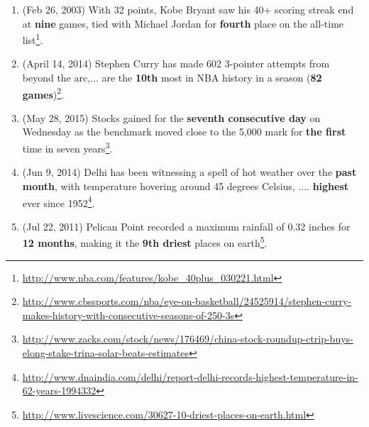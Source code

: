 \begin{enumerate}
\setlength\itemsep{-0.05cm}
\item(Feb 26, 2003) With 32 points, Kobe Bryant saw his 40+ scoring streak end at \textbf{nine} games,  tied with Michael Jordan for \textbf{fourth} place on the all-time list\footnote{\url{http://www.nba.com/features/kobe_40plus_030221.html}}. 

\item(April 14, 2014) Stephen Curry has made 602 3-pointer attempts from beyond the arc,... are the \textbf{10th} most in NBA history in a season (\textbf{82 games})\footnote{\url{http://www.cbssports.com/nba/eye-on-basketball/24525914/stephen-curry-makes-history-with-consecutive-seasons-of-250-3s}}.

\item (May 28, 2015) Stocks gained for the \textbf{seventh consecutive day} on Wednesday as the benchmark moved close to the 5,000 mark for \textbf{the first} time in seven years\footnote{\url{http://www.zacks.com/stock/news/176469/china-stock-roundup-ctrip-buys-elong-stake-trina-solar-beats-estimates}}.

\item (Jun 9,  2014) Delhi has been witnessing a spell of hot weather  over the \textbf{past month}, with temperature hovering around 45 degrees Celsius, .... \textbf{highest} ever since 1952\footnote{\url{http://www.dnaindia.com/delhi/report-delhi-records-highest-temperature-in-62-years-1994332}}.

\item(Jul 22, 2011) Pelican Point recorded a maximum rainfall of 0.32 inches for \textbf{12 months}, making it the  \textbf{9th driest} places on earth\footnote{\url{http://www.livescience.com/30627-10-driest-places-on-earth.html}}.
\end{enumerate}
 
